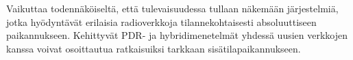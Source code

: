 Vaikuttaa todennäköiseltä, että tulevaisuudessa tullaan näkemään
järjestelmiä, jotka hyödyntävät erilaisia radioverkkoja
tilannekohtaisesti absoluuttiseen paikannukseen. Kehittyvät PDR- ja
hybridimenetelmät yhdessä uusien verkkojen kanssa voivat osoittautua
ratkaisuiksi tarkkaan sisätilapaikannukseen.
